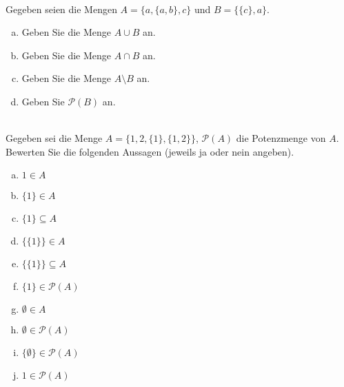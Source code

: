 \newcommand{\printpraesenzlsg}{false}
\newcommand{\printloesungen}{false}
\newcommand{\printbewertungen}{false}
\newcommand{\blattnummer}{1}




\iforiginal{}
\\
Gegeben seien die Mengen $A=\{a,\{a,b\},c\}$ und $B=\{\{c\},a\}$.
\begin{enumerate}[(a)]
\item Geben Sie die Menge $A\cup B$ an.
\item Geben Sie die Menge $A\cap B$ an.
\item Geben Sie die Menge $A\setminus B$ an.
\item Geben Sie $\mathscr{P}(B)$ an.

\end{enumerate}

\\
Gegeben sei die Menge $A=\{1,2,\{1\},\{1,2\}\}$, $\mathscr{P}(A)$ die Potenzmenge von $A$. Bewerten Sie die folgenden Aussagen (jeweils ja oder nein angeben).
\begin{enumerate}[(a)]
\item $1\in A$
\item $\{1\}\in A$
\item $\{1\}\subseteq A$
\item $\{\{1\}\}\in A$
\item $\{\{1\}\}\subseteq A$
\item $\{1\}\in\mathscr{P}(A)$
\item $\emptyset\in A$
\item $\emptyset\in\mathscr{P}(A)$
\item $\{\emptyset\}\in\mathscr{P}(A)$
\item $1\in\mathscr{P}(A)$
\end{enumerate}

